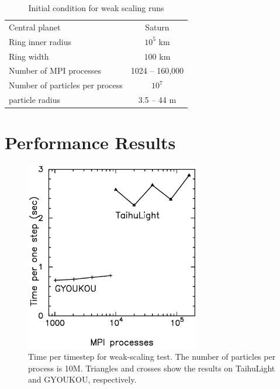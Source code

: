 \documentclass[conference]{IEEEtran}
\begin{document}
\begin{table}
\centering
 \caption{Initial condition for weak scaling runs}
 \label{tab:initialcoditions}
 \begin{tabular}{lc}
\hline
   Central planet & Saturn\\
   Ring inner radius & $10^5$ km\\
   Ring width        & $100$ km\\
   Number of MPI processes & 1024 -- 160,000 \\
   Number of particles per process & $10^7$  \\
   particle radius & 3.5 -- 44 m\\
\hline
\end{tabular}
\end{table}


  
  \section{Performance Results}


\begin{figure}
\includegraphics[width=3in]{weak_scaling2}
\caption{Time per timestep for weak-scaling test. The number of
  particles per process is 10M. Triangles and crosses  show the
  results on TaihuLight and GYOUKOU, respectively.
}
\label{fig:weak}
\end{figure}
\end{document}
